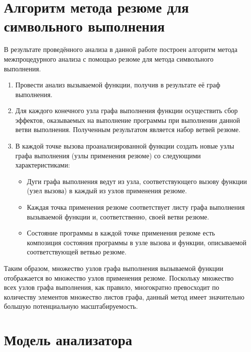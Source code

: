 \section{Алгоритм метода резюме для символьного выполнения}

В результате проведённого анализа в данной работе построен алгоритм метода межпроцедурного анализа с помощью резюме для метода символьного выполнения.

\begin{enumerate}
 \item Провести анализ вызываемой функции, получив в результате её граф выполнения.
 \item Для каждого конечного узла графа выполнения функции осуществить сбор эффектов, оказываемых на выполнение программы при выполнении данной ветви выполнения. Полученным результатом является набор ветвей резюме.
 \item В каждой точке вызова проанализированной функции создать новые узлы графа выполнения (узлы применения резюме) со следующими характеристиками:
 \begin{itemize}
  \item Дуги графа выполнения ведут из узла, соответствующего вызову функции (узел вызова) в каждый из узлов применения резюме.
  \item Каждая точка применения резюме соответствует листу графа выполнения вызываемой функции и, соответственно, своей ветви резюме.
  \item Состояние программы в каждой точке применения резюме есть композиция состояния программы в узле вызова и функции, описываемой соответствующей ветвью резюме.
 \end{itemize}
\end{enumerate}

Таким образом, множество узлов графа выполнения вызываемой функции отображается во множество узлов применения резюме. Поскольку множество всех узлов графа выполнения, как правило, многократно превосходит по количеству элементов множество листов графа, данный метод имеет значительно большую потенциальную масштабируемость.


\section{Модель анализатора} \label{sect2_1}

